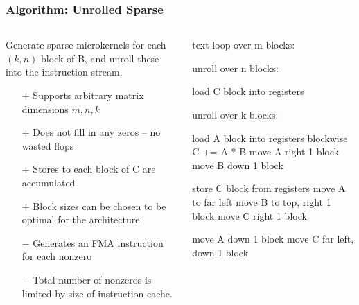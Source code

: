 \documentclass[9pt]{beamer}
\begin{document}
\begin{frame}[fragile]
  \frametitle{Algorithm: Unrolled Sparse}
  \begin{columns}[t]%
    \begin{column}{0.5\textwidth}
      Generate sparse microkernels for each $(k,n)$ block of B, and unroll these into the instruction stream.
      \begin{itemize}
      \item[$+$] Supports arbitrary matrix dimensions $m,n,k$
      \item[$+$] Does not fill in any zeros -- no wasted flops
      \item[$+$] Stores to each block of C are accumulated
      \item[$+$] Block sizes can be chosen to be optimal for the architecture

      \item[$-$] Generates an FMA instruction for each nonzero
      \item[$-$] Total number of nonzeros is limited by size of instruction cache.

      \end{itemize}
    \end{column}
    \begin{column}{0.5\textwidth}
      \begin{ccode}[]
        {text}
        loop over m blocks:

           unroll over n blocks:

              load C block into registers

              unroll over k blocks:

                 load A block into registers
                 blockwise C += A * B
                 move A right 1 block
                 move B down 1 block

              store C block from registers
              move A to far left
              move B to top, right 1 block
              move C right 1 block

           move A down 1 block
           move C far left, down 1 block
      \end{ccode}
    \end{column}
  \end{columns}
\end{frame}
\end{document}
